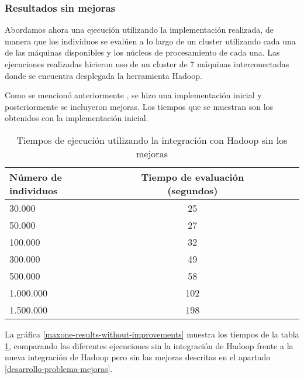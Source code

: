 \subsubsection{Resultados sin mejoras}

Abordamos ahora una ejecución utilizando la implementación realizada, de manera que los individuos se evalúen a lo largo de un cluster utilizando cada una de las m\'aquinas disponibles y los núcleos de procesamiento de cada una. Las ejecuciones realizadas hicieron uso de un cluster de 7 m\'aquinas interconectadas donde se encuentra desplegada la herramienta Hadoop. 

Como se mencion\'o anteriormente , se hizo una implementación inicial y posteriormente se incluyeron mejoras. Los tiempos que se muestran  son los obtenidos con la implementación inicial.

\label{resultados-sin-mejoras}

\begin{table}[H]
  \begin{center}
    \begin{center}
    \begin{tabular}{l | c c c c}
    N\'umero de individuos & Tiempo de evaluaci\'on (segundos)\\ \hline
    30.000 & 25\\
    50.000 & 27\\
    100.000 & 32\\
    300.000 & 49\\
    500.000 & 58\\
    1.000.000 & 102\\
    1.500.000 & 198\\
    \end{tabular}
    \end{center}
    \caption{Tiempos de ejecuci\'on utilizando la integraci\'on con Hadoop sin los mejoras}
    \label{tabla_tiempos_hadoop_sin_mejoras}
  \end{center}
\end{table}

La gr\'afica \ref{maxone-results-without-improvements} muestra los tiempos de la tabla \ref{tabla_tiempos_hadoop_sin_mejoras}, comparando las diferentes ejecuciones sin la integración de Hadoop frente a la nueva integración de Hadoop pero sin las mejoras descritas en el apartado \ref{desarrollo-problema-mejoras}.


